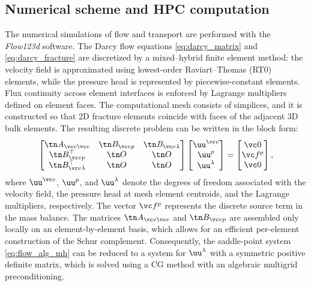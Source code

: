 

\subsection{Numerical scheme and HPC computation}

The numerical simulations of flow and transport are performed with the \emph{Flow123d} software. The Darcy flow equations \eqref{eq:darcy_matrix} and \eqref{eq:darcy_fracture} are discretized by a mixed--hybrid finite element method: the velocity field is approximated using lowest-order Raviart--Thomas (RT0) elements, while the pressure head is represented by piecewise-constant  elements. Flux continuity across element interfaces is enforced by Lagrange multipliers defined on element faces. The computational mesh consists of simplices, and it is constructed so that 2D fracture elements coincide with faces of the adjacent 3D bulk elements. The resulting discrete problem can be written in the block form:
\begin{equation}
\label{eq:flow_alg_mh} 
\begin{bmatrix}
\tn A_{\vc v\vc v} & \tn B_{\vc v p} & \tn B_{\vc v\lambda}\\
\tn B_{\vc v p}^\top & \tn O & \tn O\\
\tn B_{\vc v\lambda}^\top & \tn O & \tn O
\end{bmatrix}
%
\begin{bmatrix}
\uu^{\vc v}\\ 
\uu^p\\
\uu^\lambda
\end{bmatrix} = 
%
\begin{bmatrix}
\vc 0\\
\vc f^p\\
\vc 0
\end{bmatrix}, 
\end{equation}
where $\uu^{\vc v}$, $\uu^p$, and $\uu^\lambda$ denote the degrees of freedom associated with the velocity field, the pressure head at mesh element centroids, and the Lagrange multipliers, respectively. The vector $\vc f^p$ represents the discrete source term in the mass balance. The matrices $\tn A_{\vc v\vc v}$ and $\tn B_{\vc v p}$ are assembled only locally on an element-by-element basis, which allows for an efficient per-element construction of the Schur complement. Consequently, the saddle-point system \eqref{eq:flow_alg_mh} can be reduced to a system for $\uu^\lambda$ with a symmetric positive definite matrix, which is solved using a CG method with an algebraic multigrid preconditioning.

